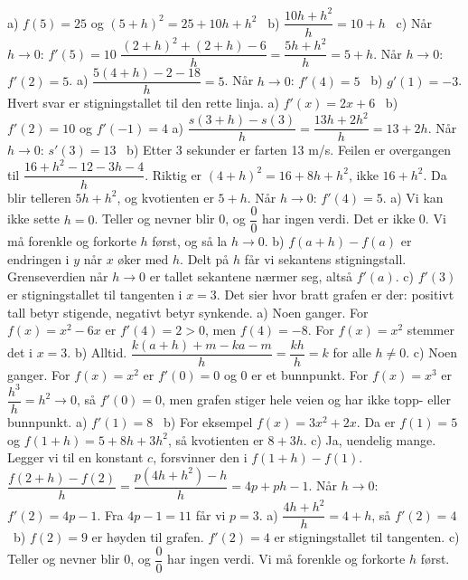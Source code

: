 
 a) $f(5) = 25$ og $(5 + h)^2 = 25 + 10h + h^2$ \ b) $\dfrac{10h + h^2}{h} = 10 + h$ \ c) Når $h \to 0$: $f'(5) = 10$
 $\dfrac{(2 + h)^2 + (2 + h) - 6}{h} = \dfrac{5h + h^2}{h} = 5 + h$. Når $h \to 0$: $f'(2) = 5$.
 a) $\dfrac{5(4 + h) - 2 - 18}{h} = 5$. Når $h \to 0$: $f'(4) = 5$ \ b) $g'(1) = -3$. Hvert svar er stigningstallet til den rette linja.
 a) $f'(x) = 2x + 6$ \ b) $f'(2) = 10$ og $f'(-1) = 4$
 a) $\dfrac{s(3 + h) - s(3)}{h} = \dfrac{13h + 2h^2}{h} = 13 + 2h$. Når $h \to 0$: $s'(3) = 13$ \ b) Etter 3 sekunder er farten 13 m/s.
 Feilen er overgangen til $\dfrac{16 + h^2 - 12 - 3h - 4}{h}$. Riktig er $(4 + h)^2 = 16 + 8h + h^2$, ikke $16 + h^2$. Da blir telleren $5h + h^2$, og kvotienten er $5 + h$. Når $h \to 0$: $f'(4) = 5$.
 a) Vi kan ikke sette $h = 0$. Teller og nevner blir 0, og $\dfrac{0}{0}$ har ingen verdi. Det er ikke 0. Vi må forenkle og forkorte $h$ først, og så la $h \to 0$.
b) $f(a + h) - f(a)$ er endringen i $y$ når $x$ øker med $h$. Delt på $h$ får vi sekantens stigningstall. Grenseverdien når $h \to 0$ er tallet sekantene nærmer seg, altså $f'(a)$.
c) $f'(3)$ er stigningstallet til tangenten i $x = 3$. Det sier hvor bratt grafen er der: positivt tall betyr stigende, negativt betyr synkende.
 a) Noen ganger. For $f(x) = x^2 - 6x$ er $f'(4) = 2 > 0$, men $f(4) = -8$. For $f(x) = x^2$ stemmer det i $x = 3$.
b) Alltid. $\dfrac{k(a + h) + m - ka - m}{h} = \dfrac{kh}{h} = k$ for alle $h \neq 0$.
c) Noen ganger. For $f(x) = x^2$ er $f'(0) = 0$ og $0$ er et bunnpunkt. For $f(x) = x^3$ er $\dfrac{h^3}{h} = h^2 \to 0$, så $f'(0) = 0$, men grafen stiger hele veien og har ikke topp- eller bunnpunkt.
 a) $f'(1) = 8$ \ b) For eksempel $f(x) = 3x^2 + 2x$. Da er $f(1) = 5$ og $f(1 + h) = 5 + 8h + 3h^2$, så kvotienten er $8 + 3h$.
c) Ja, uendelig mange. Legger vi til en konstant $c$, forsvinner den i $f(1 + h) - f(1)$.
 $\dfrac{f(2 + h) - f(2)}{h} = \dfrac{p(4h + h^2) - h}{h} = 4p + ph - 1$. Når $h \to 0$: $f'(2) = 4p - 1$. Fra $4p - 1 = 11$ får vi $p = 3$.
 a) $\dfrac{4h + h^2}{h} = 4 + h$, så $f'(2) = 4$ \ b) $f(2) = 9$ er høyden til grafen. $f'(2) = 4$ er stigningstallet til tangenten. c) Teller og nevner blir 0, og $\dfrac{0}{0}$ har ingen verdi. Vi må forenkle og forkorte $h$ først.

